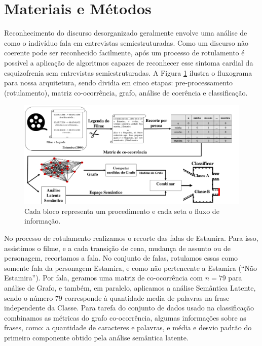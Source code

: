 \documentclass[11pt]{article}
\begin{document}
\section{Materiais e Métodos}\label{sec:mate}\vspace{-0.15cm}


Reconhecimento do discurso desorganizado geralmente envolve uma análise de como o indivíduo fala em entrevistas semiestruturadas. Como um discurso não coerente pode ser reconhecido facilmente, após um processo de rotulamento é possível a aplicação de algoritmos capazes de reconhecer esse sintoma cardial da esquizofrenia sem entrevistas semiestruturadas.  A Figura \ref{fig:fluxo} ilustra o fluxograma para nossa arquitetura, sendo dividia em cinco etapas: pre-processamento (rotulamento), matriz co-ocorrência, grafo, análise de coerência e classificação.

\begin{figure}[!ht]
    \centering
    \includegraphics[width=0.8\linewidth]{figures/fluxogramaBruno.pdf}
    \caption{{\footnotesize Cada bloco representa um procedimento e cada seta o fluxo de informação.\vspace{-0.15cm}}}
    \label{fig:fluxo}
\end{figure}


No processo de rotulamento realizamos o recorte das falas de Estamira. Para isso, assistimos o filme, e a cada transição de cena, mudança de assunto ou de personagem, recortamos a fala. No conjunto de falas, rotulamos essas como somente fala da personagem Estamira, e como não pertencente a Estamira (“Não Estamira”). Por fala, geramos uma matriz de co-ocorrência com $n=79$ para análise de Grafo, e também, em paralelo, aplicamos a análise Semântica Latente, sendo o número $79$ corresponde à quantidade media de palavras na frase independente da Classe. Para tarefa do conjunto de dados usado na classificação combinamos as métricas do grafo co-ocorrência, algumas informações sobre as frases, como: a quantidade de caracteres e palavras, e média e desvio padrão do primeiro componente obtido pela análise semântica latente.
\end{document}
